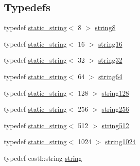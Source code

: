\subsection*{Typedefs}
\begin{DoxyCompactItemize}
\item 
typedef \hyperlink{classcrap_1_1static__string}{static\-\_\-string}$<$ 8 $>$ \hyperlink{namespacecrap_af81ccb9ee7f78a006a2cde6a0eb8d5d7}{string8}
\item 
typedef \hyperlink{classcrap_1_1static__string}{static\-\_\-string}$<$ 16 $>$ \hyperlink{namespacecrap_a8dc1eae8e96102b47b5713e982ddc7b6}{string16}
\item 
typedef \hyperlink{classcrap_1_1static__string}{static\-\_\-string}$<$ 32 $>$ \hyperlink{namespacecrap_a9dbe4066627ef2d677c31e9312ae0778}{string32}
\item 
typedef \hyperlink{classcrap_1_1static__string}{static\-\_\-string}$<$ 64 $>$ \hyperlink{namespacecrap_a502636a1c5819e8500d07deed797ef9f}{string64}
\item 
typedef \hyperlink{classcrap_1_1static__string}{static\-\_\-string}$<$ 128 $>$ \hyperlink{namespacecrap_a7cb51c6f3af6edffb8c3bf40c6f44171}{string128}
\item 
typedef \hyperlink{classcrap_1_1static__string}{static\-\_\-string}$<$ 256 $>$ \hyperlink{namespacecrap_a3bce61c9c06c1edabf6ed73d0b7eaa84}{string256}
\item 
typedef \hyperlink{classcrap_1_1static__string}{static\-\_\-string}$<$ 512 $>$ \hyperlink{namespacecrap_ac5fc39b42209e388d9ebe20d07ad5e15}{string512}
\item 
typedef \hyperlink{classcrap_1_1static__string}{static\-\_\-string}$<$ 1024 $>$ \hyperlink{namespacecrap_ae384aff63badcde7befe41d0b09ad95a}{string1024}
\item 
typedef eastl\-::string \hyperlink{namespacecrap_a0fce4d4cb2ab9ac432be9d65ed985e89}{string}
\end{DoxyCompactItemize}
